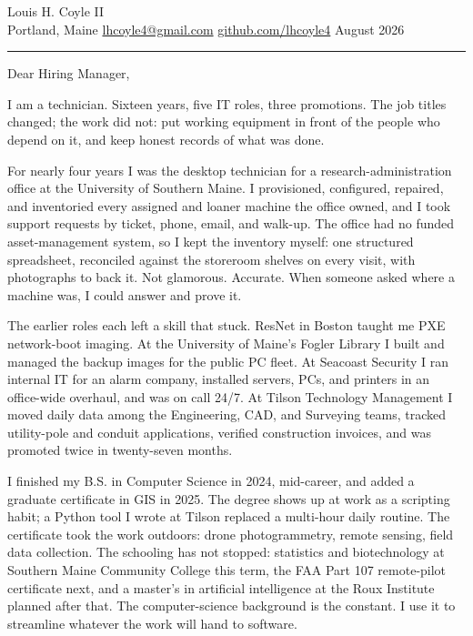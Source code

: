 \documentclass[10pt,letterpaper]{article}
\makeatletter
\newcommand{\contactline}{Portland, Maine \textbullet{} \href{mailto:lhcoyle4@gmail.com}{lhcoyle4@gmail.com} \textbullet{} \href{https://github.com/lhcoyle4}{github.com/lhcoyle4}}
\makeatother
\begin{document}
\begin{center}
  {\LARGE Louis H. Coyle II}\\[4pt]
  {\small \contactline{} \textbullet{} August 2026}
\end{center}
\vspace{2pt}\hrule\vspace{14pt}

Dear Hiring Manager,

I am a technician. Sixteen years, five IT roles, three promotions. The job titles changed; the work did not: put working equipment in front of the people who depend on it, and keep honest records of what was done.

For nearly four years I was the desktop technician for a research-administration office at the University of Southern Maine. I provisioned, configured, repaired, and inventoried every assigned and loaner machine the office owned, and I took support requests by ticket, phone, email, and walk-up. The office had no funded asset-management system, so I kept the inventory myself: one structured spreadsheet, reconciled against the storeroom shelves on every visit, with photographs to back it. Not glamorous. Accurate. When someone asked where a machine was, I could answer and prove it.

The earlier roles each left a skill that stuck. ResNet in Boston taught me PXE network-boot imaging. At the University of Maine's Fogler Library I built and managed the backup images for the public PC fleet. At Seacoast Security I ran internal IT for an alarm company, installed servers, PCs, and printers in an office-wide overhaul, and was on call 24/7. At Tilson Technology Management I moved daily data among the Engineering, CAD, and Surveying teams, tracked utility-pole and conduit applications, verified construction invoices, and was promoted twice in twenty-seven months.

I finished my B.S. in Computer Science in 2024, mid-career, and added a graduate certificate in GIS in 2025. The degree shows up at work as a scripting habit; a Python tool I wrote at Tilson replaced a multi-hour daily routine. The certificate took the work outdoors: drone photogrammetry, remote sensing, field data collection. The schooling has not stopped: statistics and biotechnology at Southern Maine Community College this term, the FAA Part 107 remote-pilot certificate next, and a master's in artificial intelligence at the Roux Institute planned after that. The computer-science background is the constant. I use it to streamline whatever the work will hand to software.
\end{document}
